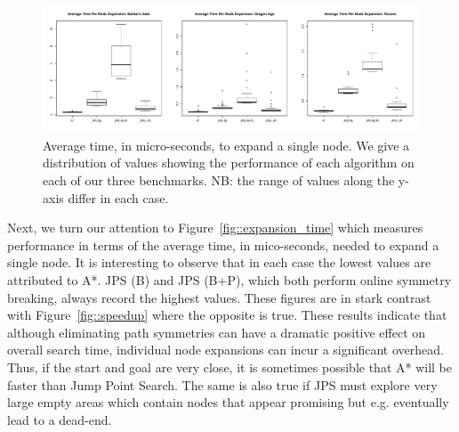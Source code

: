 \begin{figure}[tb]
       \begin{center}
		   \includegraphics[width=0.95\columnwidth, trim = 0mm 0mm 0mm 0mm]
			{diagrams/avg_time_per_node.pdf}
       \end{center}
\caption{Average time, in micro-seconds, to expand a single node. We give a distribution of values showing the performance of each algorithm
on each of our three benchmarks. NB: the range of values along the y-axis differ in each case.}
\label{fig::node_speedup}
\end{figure}

Next, we turn our attention to Figure~\ref{fig::expansion_time} which measures
performance in terms of the average time, in mico-seconds, needed to expand a single node.
It is interesting to observe that in each case the lowest values are attributed to A*. 
JPS (B) and JPS (B+P), which both perform online symmetry breaking, always record
the highest values. These figures are in stark contrast with Figure~\ref{fig::speedup} where
the opposite is true. These results indicate that although eliminating path symmetries can have
a dramatic positive effect on overall search time, individual node expansions can incur a 
significant overhead. Thus, if the start and goal are very close, it is sometimes possible that
A* will be faster than Jump Point Search. The same is also true if JPS must explore very large
empty areas which contain nodes that appear promising but e.g. eventually lead to a dead-end.

